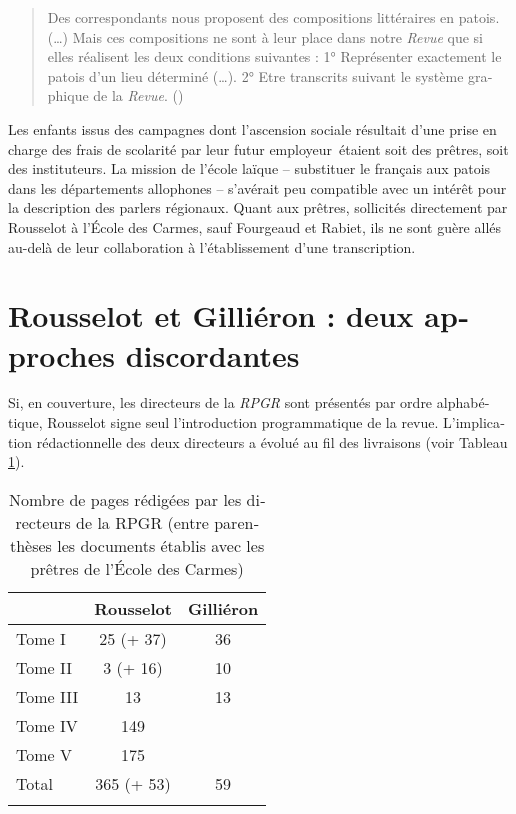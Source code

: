 \documentclass[french,output=paper,colorlinks,citecolor=brown]{../langscibook}
\begin{document}
\begin{otherlanguage}{french}
\begin{quote}
    Des correspondants nous proposent des compositions littéraires en patois. (…) Mais ces compositions ne sont à leur place dans notre \textit{Revue} que si elles réalisent les deux conditions suivantes : 1° Représenter exactement le patois d’un lieu déterminé (…). 2° Etre transcrits suivant le système graphique de la \textit{Revue}. (\citealt[III-159]{GilliéronRousselot1887})
\end{quote}

Les enfants issus des campagnes dont l’ascension sociale résultait d’une prise en charge des frais de scolarité par leur futur employeur~étaient soit des prêtres, soit des instituteurs. La mission de l’école laïque – substituer le français aux patois dans les départements allophones – s’avérait peu compatible avec un intérêt pour la description des parlers régionaux. Quant aux prêtres, sollicités directement par Rousselot à l’École des Carmes, sauf Fourgeaud et Rabiet, ils ne sont guère allés au-delà de leur collaboration à l’établissement d’une transcription. 

\section{Rousselot et Gilliéron : deux approches discordantes}
\largerpage
Si, en couverture, les directeurs de la \textit{RPGR} sont présentés par ordre alphabétique, Rousselot signe seul l’introduction programmatique de la revue. L’implication rédactionnelle des deux directeurs a évolué au fil des livraisons (voir Tableau \ref{table: Tab.1}).

\begin{table}
\begin{tabular}{lcc}
\lsptoprule
          &    Rousselot    &    Gilliéron \\\midrule
Tome I   &   25  (+ 37)     &         36 \\
Tome II  &  3 (+ 16)           &    10 \\
Tome III  &  13       &         13 \\
Tome IV  &   149  & \\
Tome V  &  175      &    \\\midrule
Total   &   365 (+ 53)     &         59\\
\lspbottomrule 
\end{tabular}
\caption{Nombre de pages rédigées par les directeurs de la RPGR (entre parenthèses les documents établis avec les prêtres de l’École des Carmes)\label{table: Tab.1}}
\end{table}


\end{otherlanguage}
\end{document}
